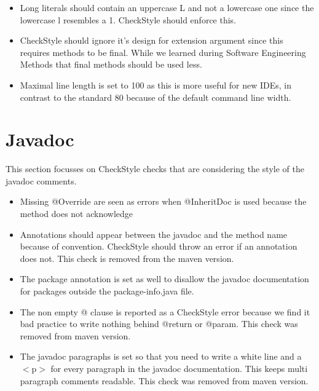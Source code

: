 \documentclass[11pt,a4paper]{report}
\begin{document}
\begin{itemize}
\item Long literals should contain an uppercase L and not a lowercase one since the lowercase l resembles a 1. CheckStyle should enforce this.

\item CheckStyle should ignore it's design for extension argument since this requires methods to be final. While we learned during Software Engineering Methods that final methods should be used less.

\item Maximal line length is set to 100 as this is more useful for new IDEs, in contrast to the standard 80 because of the default command line width.

\end{itemize}

\section{Javadoc}

This section focusses on CheckStyle checks that are considering the style of the javadoc comments.

\begin{itemize}

\item Missing @Override are seen as errors when @InheritDoc is used because the method does not acknowledge 

\item Annotations should appear between the javadoc and the method name because of convention. CheckStyle should throw an error if an annotation does not. This check is removed from the maven version.

\item The package annotation is set as well to disallow the javadoc documentation for packages outside the package-info.java file.

\item The non empty @ clause is reported as a CheckStyle error because we find it bad practice to write nothing behind @return or @param. This check was removed from maven version.

\item The javadoc paragraphs is set so that you need to write a white line and a $<$p$>$ for every paragraph in the javadoc documentation. This keeps multi paragraph comments readable. This check was removed from maven version.

\end{itemize}
\end{document}
